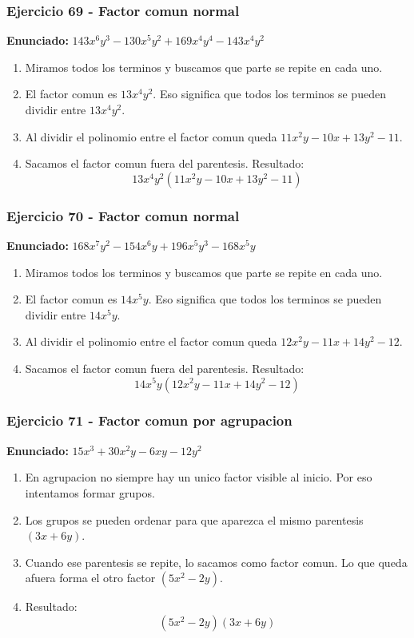 \documentclass[11pt,a4paper]{article}
\begin{document}
\subsubsection*{Ejercicio 69 - Factor comun normal}
\textbf{Enunciado:} $ 143 x^{6} y^{3} - 130 x^{5} y^{2} + 169 x^{4} y^{4} - 143 x^{4} y^{2} $\par
\begin{enumerate}[leftmargin=2em]
\item Miramos todos los terminos y buscamos que parte se repite en cada uno.
\item El factor comun es \(13 x^{4} y^{2}\). Eso significa que todos los terminos se pueden dividir entre \(13 x^{4} y^{2}\).
\item Al dividir el polinomio entre el factor comun queda \(11 x^{2} y - 10 x + 13 y^{2} - 11\).
\item Sacamos el factor comun fuera del parentesis. Resultado: \[\boxed{13 x^{4} y^{2}\left(11 x^{2} y - 10 x + 13 y^{2} - 11\right)}\]
\end{enumerate}

\vspace{0.2cm}
\subsubsection*{Ejercicio 70 - Factor comun normal}
\textbf{Enunciado:} $ 168 x^{7} y^{2} - 154 x^{6} y + 196 x^{5} y^{3} - 168 x^{5} y $\par
\begin{enumerate}[leftmargin=2em]
\item Miramos todos los terminos y buscamos que parte se repite en cada uno.
\item El factor comun es \(14 x^{5} y\). Eso significa que todos los terminos se pueden dividir entre \(14 x^{5} y\).
\item Al dividir el polinomio entre el factor comun queda \(12 x^{2} y - 11 x + 14 y^{2} - 12\).
\item Sacamos el factor comun fuera del parentesis. Resultado: \[\boxed{14 x^{5} y\left(12 x^{2} y - 11 x + 14 y^{2} - 12\right)}\]
\end{enumerate}

\vspace{0.2cm}
\subsubsection*{Ejercicio 71 - Factor comun por agrupacion}
\textbf{Enunciado:} $ 15 x^{3} + 30 x^{2} y - 6 x y - 12 y^{2} $\par
\begin{enumerate}[leftmargin=2em]
\item En agrupacion no siempre hay un unico factor visible al inicio. Por eso intentamos formar grupos.
\item Los grupos se pueden ordenar para que aparezca el mismo parentesis \((3 x + 6 y)\).
\item Cuando ese parentesis se repite, lo sacamos como factor comun. Lo que queda afuera forma el otro factor \((5 x^{2} - 2 y)\).
\item Resultado: \[\boxed{\left(5 x^{2} - 2 y\right)\left(3 x + 6 y\right)}\]
\end{enumerate}
\end{document}

